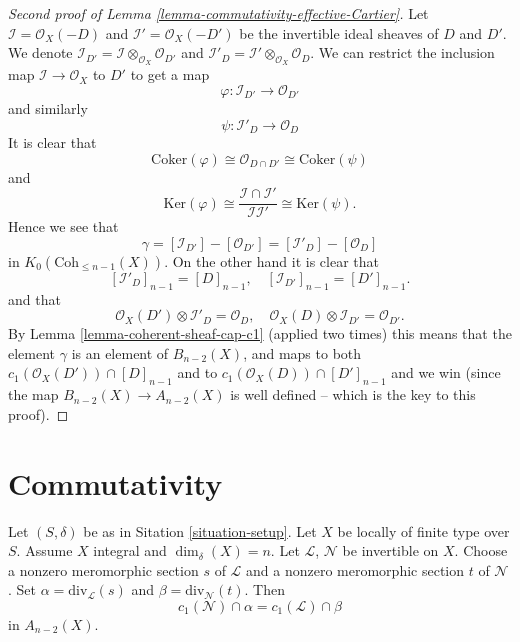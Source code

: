 \begin{proof}[Second proof of Lemma \ref{lemma-commutativity-effective-Cartier}]
Let $\mathcal{I} = \mathcal{O}_X(-D)$ and
$\mathcal{I}' = \mathcal{O}_X(-D')$ be the invertible
ideal sheaves of $D$ and $D'$.
We denote
$\mathcal{I}_{D'} = \mathcal{I} \otimes_{\mathcal{O}_X} \mathcal{O}_{D'}$
and
$\mathcal{I}'_D = \mathcal{I}' \otimes_{\mathcal{O}_X} \mathcal{O}_D$.
We can restrict the inclusion map $\mathcal{I} \to \mathcal{O}_X$
to $D'$ to get a map
$$
\varphi : \mathcal{I}_{D'} \longrightarrow \mathcal{O}_{D'}
$$
and similarly
$$
\psi: \mathcal{I}'_D \longrightarrow \mathcal{O}_D
$$
It is clear that
$$
\text{Coker}(\varphi)
\cong
\mathcal{O}_{D \cap D'}
\cong
\text{Coker}(\psi)
$$
and
$$
\text{Ker}(\varphi) 
\cong
\frac{\mathcal{I} \cap \mathcal{I}'}{\mathcal{I}\mathcal{I}'}
\cong
\text{Ker}(\psi).
$$
Hence we see that
$$
\gamma =
[\mathcal{I}_{D'}] - [\mathcal{O}_{D'}]
=
[\mathcal{I}'_D] - [\mathcal{O}_D]
$$
in $K_0(\text{Coh}_{\leq n - 1}(X))$. On the other hand it is clear that
$$
[\mathcal{I}'_D]_{n - 1} = [D]_{n - 1},\quad
[\mathcal{I}_{D'}]_{n - 1} = [D']_{n - 1}.
$$
and that
$$
\mathcal{O}_X(D') \otimes \mathcal{I}'_D = \mathcal{O}_D, \quad
\mathcal{O}_X(D) \otimes \mathcal{I}_{D'} = \mathcal{O}_{D'}.
$$
By Lemma \ref{lemma-coherent-sheaf-cap-c1} (applied two times)
this means that the element $\gamma$ is an element of $B_{n - 2}(X)$, and
maps to both $c_1(\mathcal{O}_X(D')) \cap [D]_{n - 1}$ and to
$c_1(\mathcal{O}_X(D)) \cap [D']_{n - 1}$ and we win (since the
map $B_{n - 2}(X) \to A_{n - 2}(X)$ is well defined -- which is
the key to this proof).
\end{proof}









\section{Commutativity}
\label{section-commutativity}



\begin{lemma}
\label{lemma-commutativity-on-integral}
Let $(S, \delta)$ be as in Sitation \ref{situation-setup}.
Let $X$ be locally of finite type over $S$.
Assume $X$ integral and $\dim_\delta(X) = n$.
Let $\mathcal{L}$, $\mathcal{N}$ be invertible on $X$.
Choose a nonzero meromorphic section $s$ of $\mathcal{L}$
and a nonzero meromorphic section $t$ of $\mathcal{N}$.
Set $\alpha = \text{div}_{\mathcal{L}}(s)$ and
$\beta = \text{div}_{\mathcal{N}}(t)$.
Then
$$
c_1(\mathcal{N}) \cap \alpha
=
c_1(\mathcal{L}) \cap \beta
$$
in $A_{n - 2}(X)$.
\end{lemma}


